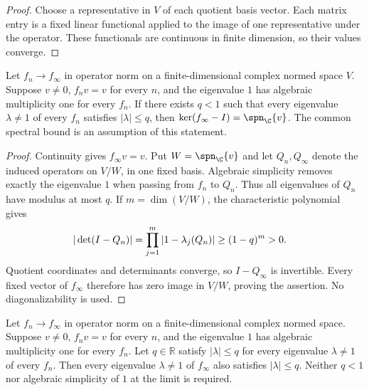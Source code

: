 \begin{proof}\leanok
    Choose a representative in $V$ of each quotient basis vector. Each
    matrix entry is a fixed linear functional applied to the image of
    one representative under the operator. These functionals are
    continuous in finite dimension, so their values converge.
\end{proof}

\begin{lemma}
    \label{thm:spc_aux_fixed_line_limit}
    \leanok
    Let $f_n\to f_\infty$ in operator norm on a finite-dimensional complex
    normed space $V$. Suppose $v\neq 0$, $f_n v=v$ for every $n$, and the
    eigenvalue $1$ has algebraic multiplicity one for every $f_n$.
    If there exists $q<1$ such that every eigenvalue $\lambda\neq 1$ of
    every $f_n$ satisfies $|\lambda|\leq q$, then
    $\ker(f_\infty-I)=\spn_{\C}\{v\}$.
    The common spectral bound is an assumption of this statement.
\end{lemma}

\begin{proof}\leanok
    Continuity gives $f_\infty v=v$. Put $W=\spn_{\C}\{v\}$ and let
    $Q_n,Q_\infty$ denote the induced operators on $V/W$, in one fixed
    basis. Algebraic simplicity removes exactly the eigenvalue $1$
    when passing from $f_n$ to $Q_n$. Thus all eigenvalues of $Q_n$ have
    modulus at most $q$. If $m=\dim(V/W)$, the characteristic polynomial
    gives
    \begin{align}
        |\det(I-Q_n)|
         & =\prod_{j=1}^m|1-\lambda_j(Q_n)|
        \geq(1-q)^m>0.\notag
    \end{align}
    Quotient coordinates and determinants converge, so $I-Q_\infty$ is
    invertible. Every fixed vector of $f_\infty$ therefore has zero
    image in $V/W$, proving the assertion. No diagonalizability is used.
\end{proof}

\begin{lemma}
    \label{thm:spc_aux_nontrivial_spectrum_limit}
    \leanok
    Let $f_n\to f_\infty$ in operator norm on a finite-dimensional complex
    normed space. Suppose $v\neq 0$, $f_n v=v$ for every $n$, and the
    eigenvalue $1$ has algebraic multiplicity one for every $f_n$.
    Let $q\in\mathbb R$ satisfy $|\lambda|\leq q$ for every eigenvalue
    $\lambda\neq 1$ of every $f_n$. Then every eigenvalue
    $\lambda\neq 1$ of $f_\infty$ also satisfies $|\lambda|\leq q$.
    Neither $q<1$ nor algebraic simplicity of $1$ at the limit is required.
\end{lemma}

